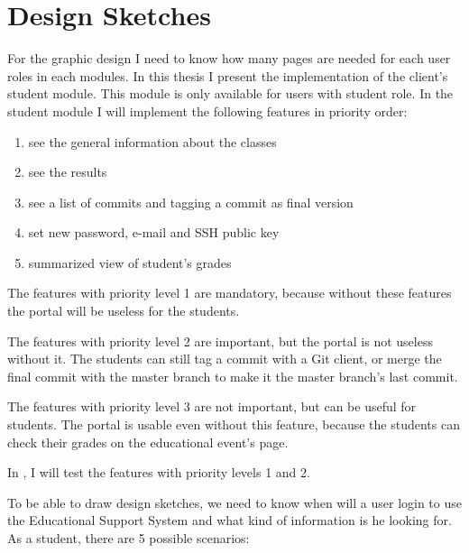 \section{Design Sketches}
\label{design-specification}
For the graphic design I need to know how many pages are needed for each user roles in each modules. In this thesis I present the implementation of the client's student module. This module is only available for users with student role. In the student module I will implement the following features in priority order:
\begin{enumerate}
	\item see the general information about the classes
	\setcounter{enumi}{0}
	\item see the results
	\item see a list of commits and tagging a commit as final version
	\setcounter{enumi}{1}
	\item set new password, e-mail and SSH public key
	\item summarized view of student's grades
\end{enumerate}

The features with priority level 1 are mandatory, because without these features the portal will be useless for the students.

The features with priority level 2 are important, but the portal is not useless without it. The students can still tag a commit with a Git client, or merge the final commit with the master branch to make it the master branch's last commit. 

The features with priority level 3 are not important, but can be useful for students. The portal is usable even without this feature, because the students can check their grades on the educational event's page.

In , I will test the features with priority levels 1 and 2.

To be able to draw design sketches, we need to know when will a user login to use the Educational Support System and what kind of information is he looking for. As a student, there are 5 possible scenarios:

